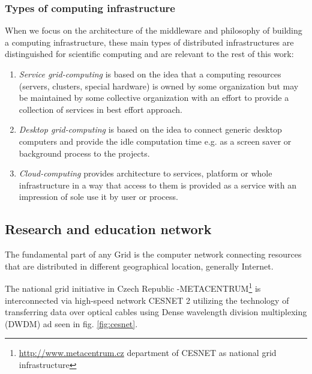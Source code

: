 \subsubsection{Types of computing infrastructure}
When we focus on the architecture of the middleware and philosophy of building a computing infrastructure, these main types of distributed infrastructures are distinguished for scientific computing and are relevant to the rest of this work:
\begin{enumerate}
\item{\emph{Service grid-computing} is based on the idea that a computing resources (servers, clusters, special hardware) is owned by some organization but may be maintained by some collective organization with an effort to provide a collection of services in best effort approach.}
\item{\emph{Desktop grid-computing} is based on the idea to connect generic desktop computers and provide the idle computation time e.g. as a screen saver or background process to the projects.}
\item{\emph{Cloud-computing} provides architecture to services, platform or whole infrastructure in a way that access to them is provided as a service with an impression of sole use it by user or process.
}
\end{enumerate}

\subsection{Research and education network}
The fundamental part of any Grid is the computer network connecting resources that are distributed in different geographical location, generally Internet. 

The national grid initiative in Czech Republic 
-METACENTRUM\footnote{\url{http://www.metacentrum.cz} department of CESNET as national grid infrastructure} is interconnected via high-speed network CESNET 2 utilizing the technology of transferring data over optical cables using Dense wavelength division multiplexing (DWDM) \cite{novak2007deployment} ad seen in fig. \ref{fig:cesnet}.

